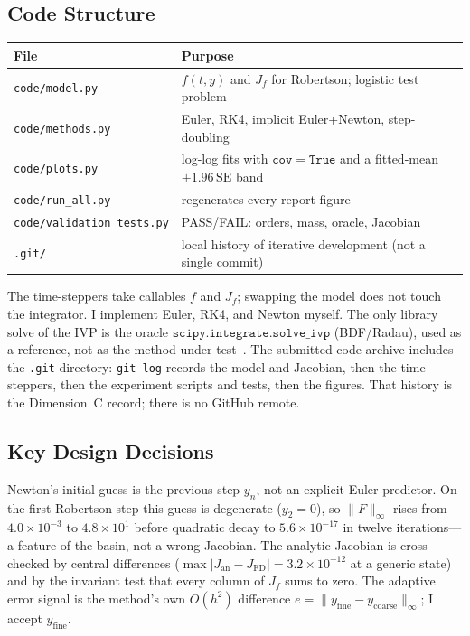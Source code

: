 \documentclass[11pt,a4paper]{article}
\begin{document}
\subsection{Code Structure}
\begin{center}
\begin{tabular}{@{}ll@{}}
\toprule
File & Purpose\\
\midrule
\texttt{code/model.py} & \(f(t,y)\) and \(J_f\) for Robertson; logistic test problem\\
\texttt{code/methods.py} & Euler, RK4, implicit Euler+Newton, step-doubling\\
\texttt{code/plots.py} & log-log fits with \(\mathtt{cov=True}\) and a fitted-mean \(\pm 1.96\,\mathrm{SE}\) band\\
\texttt{code/run\_all.py} & regenerates every report figure\\
\texttt{code/validation\_tests.py} & PASS/FAIL: orders, mass, oracle, Jacobian\\
\texttt{.git/} & local history of iterative development (not a single commit)\\
\bottomrule
\end{tabular}
\end{center}
The time-steppers take callables \(f\) and \(J_f\); swapping the model does not touch the integrator. I implement Euler, RK4, and Newton myself. The only library solve of the IVP is the oracle \(\mathtt{scipy.integrate.solve\_ivp}\) (BDF/Radau), used as a reference, not as the method under test~\cite{scipy2020}. The submitted code archive includes the \texttt{.git} directory: \texttt{git log} records the model and Jacobian, then the time-steppers, then the experiment scripts and tests, then the figures. That history is the Dimension~C record; there is no GitHub remote.

\subsection{Key Design Decisions}
Newton's initial guess is the previous step \(y_n\), not an explicit Euler predictor. On the first Robertson step this guess is degenerate (\(y_2=0\)), so \(\|F\|_\infty\) rises from \(4.0\times 10^{-3}\) to \(4.8\times 10^{1}\) before quadratic decay to \(5.6\times 10^{-17}\) in twelve iterations---a feature of the basin, not a wrong Jacobian. The analytic Jacobian is cross-checked by central differences (\(\max|J_{\mathrm{an}}-J_{\mathrm{FD}}|=3.2\times 10^{-12}\) at a generic state) and by the invariant test that every column of \(J_f\) sums to zero. The adaptive error signal is the method's own \(O(h^2)\) difference \(e=\|y_{\mathrm{fine}}-y_{\mathrm{coarse}}\|_\infty\); I accept \(y_{\mathrm{fine}}\).
\end{document}
